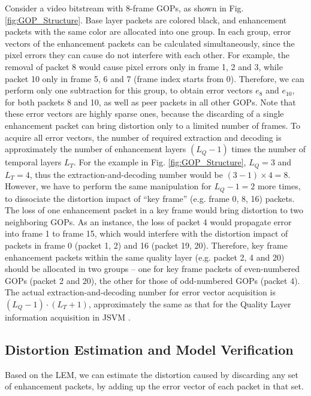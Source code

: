\documentclass[journal]{IEEEtran}
\begin{document}
Consider a video bitstream with 8-frame GOPs, as shown in Fig. \ref{fig:GOP_Structure}. Base layer packets are colored black, and enhancement packets with the same color are allocated into one group. In each group, error vectors of the enhancement packets can be calculated simultaneously, since the pixel errors they can cause do not interfere with each other. For example, the removal of packet 8 would cause pixel errors only in frame 1, 2 and 3, while packet 10 only in frame 5, 6 and 7 (frame index starts from 0). Therefore, we can perform only one subtraction for this group, to obtain error vectors $e_{8}$ and $e_{10}$, for both packets 8 and 10, as well as peer packets in all other GOPs. Note that these error vectors are highly sparse ones, because the discarding of a single enhancement packet can bring distortion only to a limited number of frames. To acquire all error vectors, the number of required extraction and decoding is approximately the number of enhancement layers $(L_Q - 1)$ times the number of temporal layers $L_T$. For the example in Fig. \ref{fig:GOP_Structure}, $L_Q = 3$ and $L_T = 4$, thus the extraction-and-decoding number would be $(3 - 1) \times 4 = 8$. However, we have to perform the same manipulation for $L_Q - 1 = 2$ more times, to dissociate the distortion impact of ``key frame'' \cite{H264Overview} (e.g. frame 0, 8, 16) packets. The loss of one enhancement packet in a key frame would bring distortion to two neighboring GOPs. As an instance, the loss of packet 4 would propagate error into frame 1 to frame 15, which would interfere with the distortion impact of packets in frame 0 (packet 1, 2) and 16 (packet 19, 20). Therefore, key frame enhancement packets within the same quality layer (e.g. packet 2, 4 and 20) should be allocated in two groups -- one for key frame packets of even-numbered GOPs (packet 2 and 20), the other for those of odd-numbered GOPs (packet 4). The actual extraction-and-decoding number for error vector acquisition is $(L_Q - 1) \cdot (L_T + 1)$, approximately the same as that for the Quality Layer information acquisition in JSVM \cite{Amonou07}.
 
\subsection{Distortion Estimation and Model Verification}
\label{subsec:distortion-estimation}

Based on the LEM, we can estimate the distortion caused by discarding any set of enhancement packets, by adding up the error vector of each packet in that set.
\end{document}
